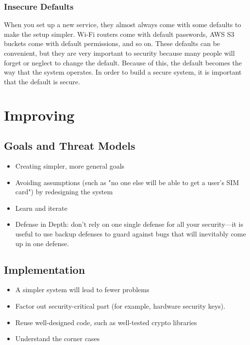 \subsubsection{Insecure Defaults}
When you set up a new service, they almost always come with some defaults to make the setup simpler. Wi-Fi routers come with default passwords, AWS S3 buckets come with default permissions, and so on. These defaults can be convenient, but they are very important to security because many people will forget or neglect to change the default. Because of this, the default becomes the way that the system operates. In order to build a secure system, it is important that the default is secure.



\section{Improving}
\subsection{Goals and Threat Models}
\begin{itemize}
	\item Creating simpler, more general goals
	\item Avoiding assumptions (such as "no one else will be able to get a user's SIM card") by redesigning the system
	\item Learn and iterate
	\item Defense in Depth: don't rely on one single defense for all your security---it is useful to use backup defenses to guard against bugs that will inevitably come up in one defense.
\end{itemize}

\subsection{Implementation}
\begin{itemize}
	\item A simpler system will lead to fewer problems
	\item Factor out security-critical part (for example, hardware security keys).
	\item Reuse well-designed code, such as well-tested crypto libraries
	\item Understand the corner cases
\end{itemize}



